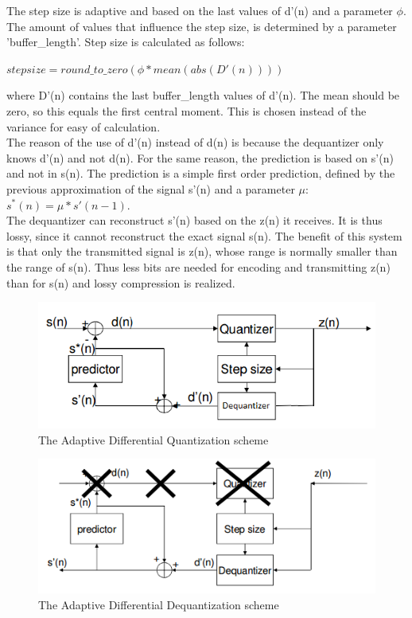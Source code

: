 \documentclass[a4paper]{article}
\begin{document}
The step size is adaptive and based on the last values of d'(n) and a parameter $\phi$. The amount of values that influence the step size, is determined by a parameter 'buffer\_length'. Step size is calculated as follows:\\
\begin{center}
$stepsize = round\_to\_zero(\phi*mean(abs(D'(n))))$\\
\end{center}
where D'(n) contains the last buffer\_length values of d'(n). The mean should be zero, so this equals the first central moment. This is chosen instead of the variance for easy of calculation. \\
The reason of the use of d'(n) instead of d(n) is because the dequantizer only knows d'(n) and not d(n). For the same reason, the prediction is based on s'(n) and not in s(n). The prediction is a simple first order prediction, defined by the previous approximation of the signal s'(n) and a parameter $\mu$:\\
$s^*(n) = \mu*s'(n-1)$.\\
The dequantizer can reconstruct s'(n) based on the z(n) it receives. It is thus lossy, since it cannot reconstruct the exact signal s(n). The benefit of this system is that only the transmitted signal is z(n), whose range is normally smaller than the range of s(n). Thus less bits are needed for encoding and transmitting z(n) than for s(n) and lossy compression is realized.
\begin{figure}[hbt]
\includegraphics[width = \textwidth]{Quantization.png}
\caption{The Adaptive Differential Quantization scheme}
\label{fig:quantization}
\end{figure}
\begin{figure}[hbt]
\includegraphics[width = \textwidth]{Dequantization.png}
\caption{The Adaptive Differential Dequantization scheme}
\label{fig:dequantization}
\end{figure}
\end{document}
